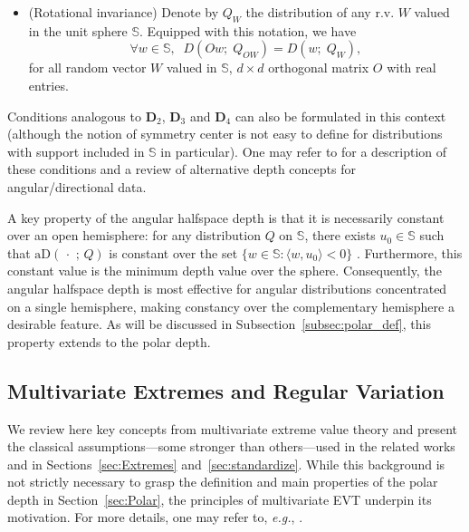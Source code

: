 \documentclass{article}
\numberwithin{equation}{section}
\newcommand{\point}{\,\cdot\,}
\newcommand{\sphere}{\mathbb{S}}
\newcommand{\aD}[2]{{\mathrm{aD}}\left({#1}\,;\,{#2}\right)}
\begin{document}
\begin{itemize}
    \item[$\mathbf{D'}_1$] {\sc (Rotational invariance)} Denote by
        $Q_W$ the distribution of any r.v. $W$ valued in the unit
        sphere $\sphere$. Equipped with this notation, we have
        \begin{equation*}\label{eq:RI}
            \forall w\in \sphere,\;\;  D(Ow;\;  Q_{OW})=D(w;\;  Q_W),
        \end{equation*}
        for all random vector  $W$ valued in $\sphere$, $d\times d$
        orthogonal matrix $O$ with real entries.
\end{itemize}
Conditions analogous to $\mathbf{D}_2$, $\mathbf{D}_3$ and
$\mathbf{D}_4$ can also be formulated in this context (although the
    notion of symmetry center is not easy to define for distributions
with support included in $\sphere$ in particular). One may refer
to \cite{NagyDemniButtarazziPorzio2023} for a description of these
conditions and a review of alternative depth concepts for
angular/directional data.

A key property of the angular halfspace depth is that it is necessarily constant over an open hemisphere: for any distribution $Q$ on $\sphere$, there exists  $u_0\in\sphere $ such that $\aD{\point}{Q}$ is constant over the set $\{w \in \sphere: \langle w, u_0\rangle <0 \}$ \citep[see][Theorem 7, for a  stronger version]{nagy2024theoretical}. Furthermore, this constant value is  the minimum depth value over the sphere. Consequently, the angular halfspace depth is most effective for angular distributions concentrated on a single hemisphere, making constancy over the complementary hemisphere a desirable feature. As will be discussed in Subsection~\ref{subsec:polar_def}, this property extends to the polar depth.


\subsection{Multivariate Extremes and Regular Variation}\label{subsec:basics_RV} %
%


We review here key concepts from multivariate extreme value theory and present the classical assumptions—some stronger than others—used in the related works and in Sections~\ref{sec:Extremes} and~\ref{sec:standardize}. While this background is not strictly necessary to grasp the definition and main properties of the polar depth in Section~\ref{sec:Polar}, the principles of multivariate EVT underpin its motivation. 
For more details, one may refer to, \textit{e.g.},
\cite{resnick2008extreme, beirlant2006statistics, de2007extreme}.
\end{document}
